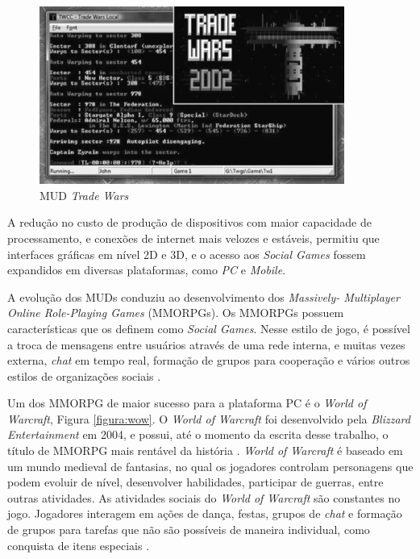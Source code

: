 \begin{figure}[h]
  \centering
  \includegraphics[width=10cm]{figuras/trade_wars.png}
  \caption{MUD \textit{Trade Wars} \cite{fields2014}}
  \label{figura:tradeWars}
\end{figure}

A redução no custo de produção de dispositivos com maior capacidade de processamento, e conexões de internet mais velozes e estáveis, permitiu que interfaces gráficas em nível 2D e 3D, e o acesso aos \textit{Social Games} fossem expandidos em diversas plataformas, como \textit{PC} e \textit{Mobile}.

A evolução dos MUDs conduziu ao desenvolvimento dos \textit{Massively- Multiplayer Online Role-Playing Games} (MMORPGs). Os MMORPGs possuem características que os definem como \textit{Social Games}. Nesse estilo de jogo, é possível a troca de mensagens entre usuários através de uma rede interna, e muitas vezes externa, \textit{chat} em tempo real, formação de grupos para cooperação e vários outros estilos de organizações sociais \cite{fields2014}.

Um dos MMORPG de maior sucesso para a plataforma PC é o \textit{World of Warcraft}, Figura \ref{figura:wow}. O \textit{World of Warcraft} foi desenvolvido pela \textit{Blizzard Entertainment} em 2004, e possui, até o momento da escrita desse trabalho, o título de MMORPG mais rentável da história \cite{thurau2010} \cite{omer2015}. \textit{World of Warcraft} é baseado em um mundo medieval de fantasias, no qual os jogadores controlam personagens que podem evoluir de nível, desenvolver habilidades, participar de guerras, entre outras atividades. As atividades sociais do \textit{World of Warcraft} são constantes no jogo. Jogadores interagem em ações de dança, festas, grupos de \textit{chat} e formação de grupos para tarefas que não são possíveis de maneira individual, como conquista de itens especiais \cite{thurau2010} \cite{nardi2006}.

